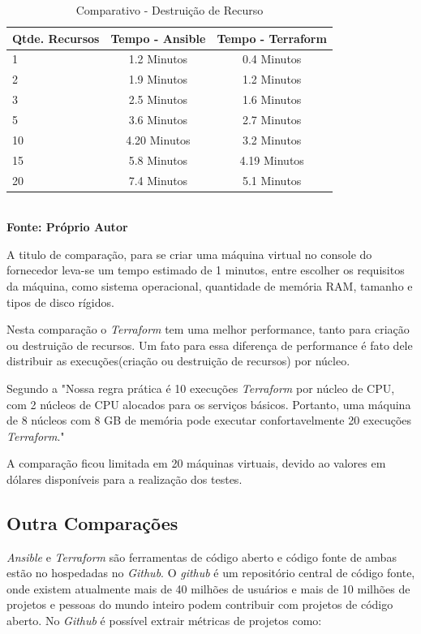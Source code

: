 \begin{table}[ht]
	\centering
	\caption{\hspace{0.1cm} Comparativo - Destruição de Recurso}
	\vspace{-0.3cm} %
	\label{tab:tabela2}
	\begin{tabular}{l|c|c}
  \hline
    \textbf{Qtde. Recursos}	& \textbf{Tempo - Ansible} & \textbf{Tempo - Terraform} \\
    \hline
  1   & 1.2  Minutos   & 0.4  Minutos    \\
2   & 1.9    Minutos   & 1.2  Minutos    \\
3   & 2.5    Minutos   & 1.6  Minutos    \\
5   & 3.6    Minutos   & 2.7  Minutos     \\
10  & 4.20   Minutos   & 3.2  Minutos      \\
15  & 5.8    Minutos   & 4.19 Minutos      \\
20  & 7.4    Minutos   & 5.1  Minutos      \\

     \hline
 \end{tabular}
 	\vspace{.1cm}  %
	\small
	{\footnotesize\\ \textbf{Fonte: Próprio Autor}}
\end{table}


A titulo de comparação, para se criar uma máquina virtual no console do fornecedor leva-se um tempo estimado de 1 minutos, entre escolher os requisitos da máquina, como sistema operacional, quantidade de memória RAM, tamanho e tipos de disco rígidos. 

Nesta comparação o \textit{Terraform} tem uma melhor performance, tanto para criação ou destruição de recursos. Um fato para essa diferença de performance é fato dele distribuir as execuções(criação ou destruição de recursos) por núcleo. 

Segundo a \cite{hashcorp03} "Nossa regra prática é 10 execuções \textit{Terraform} por núcleo de CPU, com 2 núcleos de CPU alocados para os serviços básicos.  Portanto, uma máquina de 8 núcleos com 8 GB de memória pode executar confortavelmente 20 execuções \textit{Terraform}."

A comparação ficou limitada em 20 máquinas virtuais, devido ao valores em dólares disponíveis para a realização dos testes. 

\subsection{Outra Comparações}
\textit{Ansible} e \textit{Terraform} são ferramentas de código aberto e código fonte de ambas estão no hospedadas no \textit{Github}. O \textit{github} é um repositório central de código fonte, onde existem atualmente mais de 40 milhões de usuários e mais de 10 milhões de projetos e pessoas do mundo inteiro podem contribuir com projetos de código aberto. No \textit{Github} é possível extrair métricas de projetos como: 

